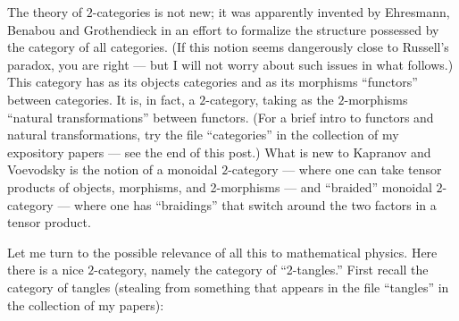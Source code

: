 \documentclass{article}
\begin{document}
The theory of \(2\)-categories is not new; it was apparently invented by
Ehresmann, Benabou and Grothendieck in an effort to formalize the
structure possessed by the category of all categories. (If this notion
seems dangerously close to Russell's paradox, you are right --- but I
will not worry about such issues in what follows.) This category has as
its objects categories and as its morphisms ``functors'' between
categories. It is, in fact, a \(2\)-category, taking as the
\(2\)-morphisms ``natural transformations'' between functors. (For a
brief intro to functors and natural transformations, try the file
``categories'' in the collection of my expository papers --- see the end
of this post.) What is new to Kapranov and Voevodsky is the notion of a
monoidal \(2\)-category --- where one can take tensor products of
objects, morphisms, and 2-morphisms --- and ``braided'' monoidal
\(2\)-category --- where one has ``braidings'' that switch around the
two factors in a tensor product.

Let me turn to the possible relevance of all this to mathematical
physics. Here there is a nice \(2\)-category, namely the category of
``2-tangles.'' First recall the category of tangles (stealing from
something that appears in the file ``tangles'' in the collection of my
papers):
\end{document}
